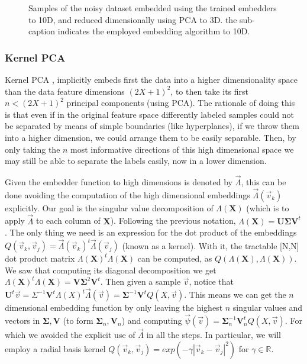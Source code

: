 \documentclass[11pt, a4paper, twoside]{article} %
\newcommand{\R}{\mathbb{R}} %
\DeclareRobustCommand{\mybox}[2][gray!10]{%
\begin{tcolorbox}[   %
        left=0.2cm,
        right=0.2cm,
        top=0.15cm,
        bottom=0.15cm,
        colback=#1,
        colframe=#1,
        width=\dimexpr\textwidth\relax, 
        enlarge left by=0mm,
        boxsep=5pt,
        arc=0pt,outer arc=0pt,
        ]
        #2
\end{tcolorbox}
}
\begin{document}
\begin{figure}[h!] 
     \centering 
    \caption{ Samples of the noisy dataset embedded using the trained embedders to 10D, and reduced dimensionally using PCA to 3D. the sub-caption indicates the employed embedding algorithm to 10D.  }
    \label{fig:embeddings2}
\end{figure}


\subsubsection*{Kernel PCA}
Kernel PCA \cite{KPCA}, implicitly embeds first the data into a higher dimensionality space than the data feature dimensions $(2X+1)^2$, to then take its first $n<(2X+1)^2$ principal components (using PCA). The rationale of doing this is that even if in the original feature space differently labeled samples could not be separated by means of simple boundaries (like hyperplanes), if we throw them into a higher dimension, we could arrange them to be easily separable. Then, by only taking the $n$ most informative directions of this high dimensional space we may still be able to separate the labels easily, now in a lower dimension.

\mybox{Given the embedder function to high dimensions is denoted by $\vec{\Lambda}$, this can be done avoiding the computation of the high dimensional embeddings $\vec{\Lambda}(\vec{v}_k)$ explicitly. Our goal is the singular value decomposition of $\Lambda(\pmb{X})$ (which is to apply $\vec{\Lambda}$ to each column of $\pmb{X}$). Following the previous notation, $\Lambda(\pmb{X})=\pmb{U}\pmb{\Sigma}\pmb{V}^t$. The only thing we need is an expression for the dot product of the embeddings $Q(\vec{v}_k, \vec{v}_j)=\vec{\Lambda}(\vec{v}_k)^t\vec{\Lambda}(\vec{v}_j)$ (known as a kernel). With it, the tractable [N,N] dot product matrix $\Lambda(\pmb{X})^t\Lambda(\pmb{X})$ can be computed, as $Q(\Lambda(\pmb{X}), \Lambda(\pmb{X}))$. We saw that computing its diagonal decomposition we get $\Lambda(\pmb{X})^t\Lambda(\pmb{X})=\pmb{V}\pmb{\Sigma}^2\pmb{V}^t$. Then given a sample $\vec{v}$, notice that $\pmb{U}^t\vec{v}=\Sigma^{-1}\pmb{V}^t\Lambda(X)^t\vec{\Lambda}(\vec{v})=\pmb{\Sigma}^{-1}\pmb{V}^tQ(X,\vec{v})$. This means we can get the $n$ dimensional embedding function by only leaving the highest $n$ singular values and vectors in $\pmb{\Sigma},\pmb{V}$ (to form $\pmb{\Sigma}_n,\pmb{V}_n$) and computing $\vec{\psi}(\vec{v})=\pmb{\Sigma}_n^{-1}\pmb{V}_n^tQ(X,\vec{v})$. For which we avoided the explicit use of $\vec{\Lambda}$ in all the steps. In particular, we will employ a radial basis kernel $Q(\vec{v}_k,\vec{v}_j)=exp(-\gamma |\vec{v}_k-\vec{v}_j|^2)$ for $\gamma\in\R$.
}
\end{document}
